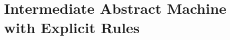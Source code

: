 \documentclass{article}
\begin{document}
\ottdefnsAbstractHighLevelSmallStep


\newpage
\section*{Intermediate Abstract Machine
  with Explicit Rules}

\ottdefnsAbstractExplicitSmallStep

\clearpage
\ottfundefnsRule
\end{document}
